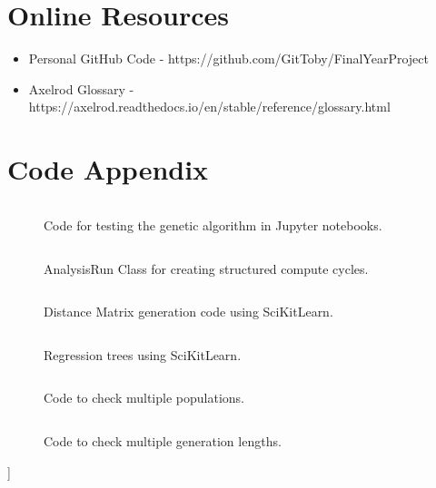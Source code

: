 \begin{appendices}
    \chapter{Online Resources}\label{apndx:resources}
    \begin{itemize}
        \item Personal GitHub Code - https://github.com/GitToby/FinalYearProject
        \item Axelrod Glossary - https://axelrod.readthedocs.io/en/stable/reference/glossary.html
    \end{itemize}
    \chapter{Code Appendix}\label{apndx:code}
    \begin{figure}[ht]
        \inputminted[fontsize=\small]{python}{./code_snippets/appendix/runGeneticAlgo.py}
        \caption{Code for testing the genetic algorithm in Jupyter notebooks.}\label{apcode:runGeneticAlgo.py}
    \end{figure}

    \begin{figure}[ht]
        \inputminted[fontsize=\small]{python}{./code_snippets/appendix/AnalysisRun.py}
        \caption{AnalysisRun Class for creating structured compute cycles.}\label{apcode:AnalysisRun.py}
    \end{figure}

    \begin{figure}[ht]
        \inputminted[fontsize=\small]{python}{./code_snippets/appendix/dist_matrix.py}
        \caption{Distance Matrix generation code using SciKitLearn.}\label{apcode:dist_matrix.py}
    \end{figure}

    \begin{figure}[ht]
        \inputminted[fontsize=\small]{python}{./code_snippets/appendix/reg_tree.py}
        \caption{Regression trees using SciKitLearn.}\label{apcode:reg_tree.py}
    \end{figure}

    \begin{figure}
        \inputminted[fontsize=\small]{python}{code_snippets/populationChecker.py}
        \caption{Code to check multiple populations.}\label{apcode:populationChecker.py}
    \end{figure}

    \begin{figure}
        \inputminted{python}{code_snippets/generationChecker.py}
        \caption{Code to check multiple generation lengths.}\label{apcode:generationChecker.py}
    \end{figure}]


\end{appendices}
